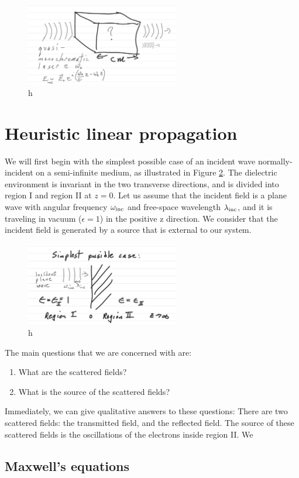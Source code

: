 \documentclass{article}
\begin{document}
\begin{figure}
    \label{fig:nonlinear_crystal}
    \includegraphics[width=0.6\textwidth]{figures/nonlinear_crystal.png}
    \centering
    \caption{h}
\end{figure}

\section{Heuristic linear propagation}
We will first begin with the simplest possible case of an incident wave normally-incident on a semi-infinite medium, as illustrated in Figure \ref{fig:plane_wave_normal_incidence}. The dielectric environment is invariant in the two transverse directions, and is divided into region I and region II at $z=0$. Let us assume that the incident field is a plane wave with angular frequency $\omega_{\rm{inc}}$ and free-space wavelength $\lambda_{\rm{inc}}$, and it is traveling in vacuum ($\epsilon=1$) in the positive z direction. We consider that the incident field is generated by a source that is external to our system. 

\begin{figure}
    \label{fig:plane_wave_normal_incidence}
    \includegraphics[width=0.6\textwidth]{figures/plane_wave_normal_incidence.png}
    \centering
    \caption{h}
\end{figure}

The main questions that we are concerned with are:
\begin{enumerate}
    \item What are the scattered fields?
    \item What is the source of the scattered fields?
\end{enumerate}

Immediately, we can give qualitative answers to these questions: There are two scattered fields: the transmitted field, and the reflected field. The source of these scattered fields is the oscillations of the electrons inside region II. We 

\subsection{Maxwell's equations}
\end{document}
